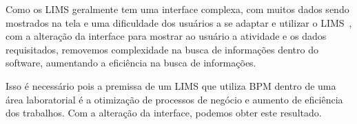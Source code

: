 
Como os LIMS geralmente tem uma interface complexa, com muitos dados sendo mostrados na tela e uma dificuldade dos usuários a se adaptar e utilizar o LIMS~\cite{Tomlinson2022AOperations}, com a alteração da interface para mostrar ao usuário a atividade e os dados requisitados, removemos complexidade na busca de informações dentro do software, aumentando a eficiência na busca de informações.


Isso é necessário pois a premissa de um LIMS que utiliza BPM dentro de uma área laboratorial é a otimização de processos de negócio e aumento de eficiência dos trabalhos. Com a alteração da interface, podemos obter este resultado.
